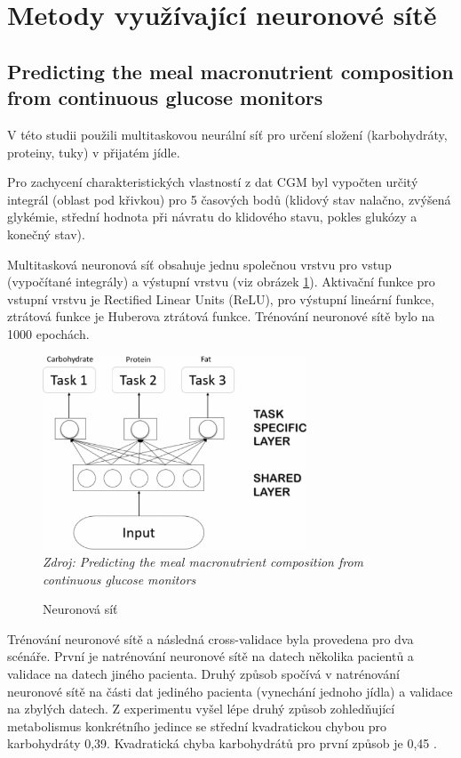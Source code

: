 \section{Metody využívající neuronové sítě}
\subsection{Predicting the meal macronutrient composition from continuous glucose monitors}
\label{ch:analyzaCHO:neuronka}

V této studii \citet{analyzaCHO.Neuronka} použili multitaskovou neurální síť pro určení složení (karbohydráty, proteiny, tuky) v přijatém jídle.

Pro zachycení charakteristických vlastností z dat CGM byl vypočten určitý integrál (oblast pod křivkou) pro 5 časových bodů (klidový stav nalačno, zvýšená glykémie, střední hodnota při návratu do klidového stavu, pokles glukózy a konečný stav).

Multitasková neuronová síť obsahuje jednu společnou vrstvu pro vstup (vypočítané integrály) a výstupní vrstvu (viz obrázek \ref{fig:analyza:neuronka}). Aktivační funkce pro vstupní vrstvu je Rectified Linear Units (ReLU), pro výstupní lineární funkce, ztrátová funkce je Huberova ztrátová funkce. Trénování neuronové sítě bylo na 1000 epochách.

\begin{figure}[H]
\caption{Neuronová síť}
\label{fig:analyza:neuronka}
\centering
\includegraphics[width=0.7\textwidth]{img/analyzaCHO/neuronka.png}\\
\textit{Zdroj: Predicting the meal macronutrient composition from continuous glucose monitors \citep{analyzaCHO.Neuronka}}
\end{figure}

Trénování neuronové sítě a následná cross-validace byla provedena pro dva scénáře. První je natrénování neuronové sítě na datech několika pacientů a validace na datech jiného pacienta. Druhý způsob spočívá v natrénování neuronové sítě na části dat jediného pacienta (vynechání jednoho jídla) a validace na zbylých datech. Z experimentu vyšel lépe druhý způsob zohledňující metabolismus konkrétního jedince se střední kvadratickou chybou pro karbohydráty 0,39. Kvadratická chyba karbohydrátů pro první způsob je 0,45 \citep{analyzaCHO.Neuronka}. 

